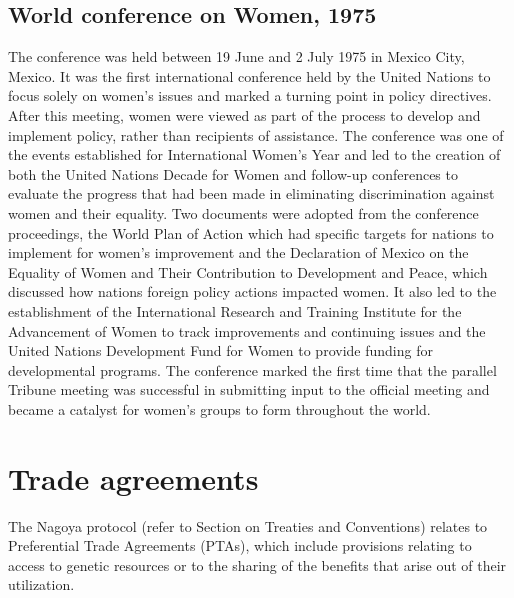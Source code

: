 \documentclass[
  openany]{book}
\begin{document}
\hypertarget{world-conference-on-women-1975}{%
\subsection{World conference on Women, 1975}\label{world-conference-on-women-1975}}

The conference was held between 19 June and 2 July 1975 in Mexico City, Mexico. It was the first international conference held by the United Nations to focus solely on women's issues and marked a turning point in policy directives. After this meeting, women were viewed as part of the process to develop and implement policy, rather than recipients of assistance. The conference was one of the events established for International Women's Year and led to the creation of both the United Nations Decade for Women and follow-up conferences to evaluate the progress that had been made in eliminating discrimination against women and their equality. Two documents were adopted from the conference proceedings, the World Plan of Action which had specific targets for nations to implement for women's improvement and the Declaration of Mexico on the Equality of Women and Their Contribution to Development and Peace, which discussed how nations foreign policy actions impacted women. It also led to the establishment of the International Research and Training Institute for the Advancement of Women to track improvements and continuing issues and the United Nations Development Fund for Women to provide funding for developmental programs. The conference marked the first time that the parallel Tribune meeting was successful in submitting input to the official meeting and became a catalyst for women's groups to form throughout the world.

\hypertarget{trade-agreements}{%
\section{Trade agreements}\label{trade-agreements}}

The Nagoya protocol (refer to Section on Treaties and Conventions) relates to Preferential Trade Agreements (PTAs), which include provisions relating to access to genetic resources or to the sharing of the benefits that arise out of their utilization.
\end{document}
